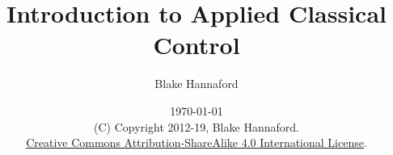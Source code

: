 \documentclass[letterpaper]{book}
\begin{document}
\setpagewiselinenumbers        %
\modulolinenumbers[5]


\frontmatter

\title{Introduction to Applied Classical Control}

\author{Blake Hannaford}

\date{\today\\(C) Copyright 2012-19, Blake Hannaford.\\
\href{http://creativecommons.org/licenses/by-sa/4.0/}{Creative Commons Attribution-ShareAlike 4.0 International License}.
 }

\maketitle

\tableofcontents




\mainmatter


\newpage
% 
 
\appendix
%


\backmatter
%
\label{LastPage}
\end{document}

